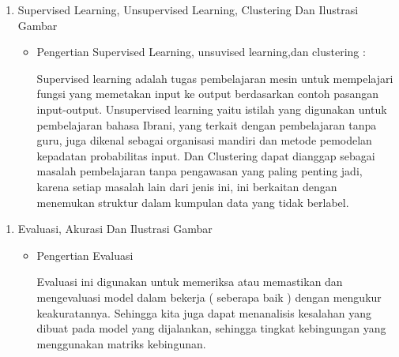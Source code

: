 \begin{enumerate}
\item Supervised Learning, Unsupervised Learning, Clustering Dan Ilustrasi Gambar
\begin{itemize}
\item Pengertian Supervised Learning, unsuvised learning,dan clustering :
\par Supervised learning adalah tugas pembelajaran mesin untuk mempelajari fungsi yang memetakan input ke output berdasarkan contoh pasangan input-output. Unsupervised learning yaitu istilah yang digunakan untuk pembelajaran bahasa Ibrani, yang terkait dengan pembelajaran tanpa guru, juga dikenal sebagai organisasi mandiri dan metode pemodelan kepadatan probabilitas input. Dan Clustering dapat dianggap sebagai masalah pembelajaran tanpa pengawasan yang paling penting jadi, karena setiap masalah lain dari jenis ini, ini berkaitan dengan menemukan struktur dalam kumpulan data yang tidak berlabel.
\end{itemize}
\end{enumerate}

\begin{enumerate}
\item Evaluasi, Akurasi Dan Ilustrasi Gambar
\begin{itemize}
\item Pengertian Evaluasi
\par Evaluasi ini digunakan untuk memeriksa atau memastikan dan mengevaluasi model dalam bekerja ( seberapa baik ) dengan mengukur keakuratannya. Sehingga kita juga dapat menanalisis kesalahan yang dibuat pada model yang dijalankan, sehingga tingkat kebingungan yang menggunakan matriks kebingunan.
\end{itemize}
\end{enumerate}

